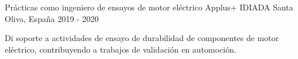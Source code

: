 \cventry
  {Pr\'acticas como ingeniero de ensayos de motor el\'ectrico}
  {Applus+ IDIADA}
  {Santa Oliva, Espa\~na}
  {2019 - 2020}
  {
    \begin{cvitems}
      \item {Di soporte a actividades de ensayo de durabilidad de componentes de motor el\'ectrico, contribuyendo a trabajos de validaci\'on en automoci\'on.}
    \end{cvitems}
  }
